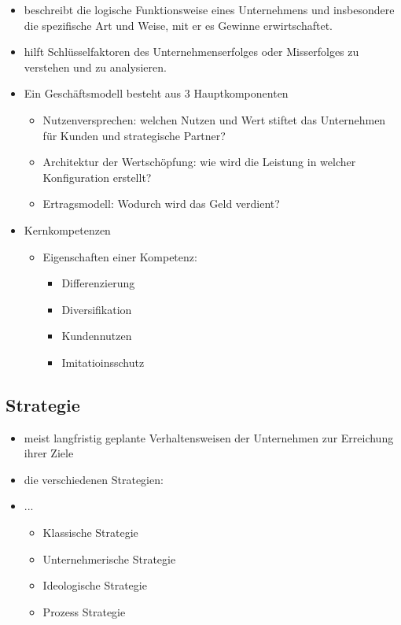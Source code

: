 \begin{itemize}
        \item beschreibt die logische Funktionsweise eines Unternehmens und insbesondere die spezifische Art und Weise, mit er es Gewinne erwirtschaftet.

        \item hilft Schlüsselfaktoren des Unternehmenserfolges oder Misserfolges zu verstehen und zu analysieren.

    \item Ein Geschäftsmodell besteht aus 3 Hauptkomponenten
    \begin{itemize}
        \item Nutzenversprechen: welchen Nutzen und Wert stiftet das Unternehmen für Kunden und strategische Partner?
        \item Architektur der Wertschöpfung: wie wird die Leistung in welcher Konfiguration erstellt?
        \item Ertragsmodell: Wodurch wird das Geld verdient?
    \end{itemize}


    \item Kernkompetenzen
    \begin{itemize}
        \item Eigenschaften einer Kompetenz:

        \begin{itemize}
            \item Differenzierung
            \item Diversifikation
            \item Kundennutzen
            \item Imitatioinsschutz
        \end{itemize}
    \end{itemize}


\end{itemize}



\subsection{Strategie}


\begin{itemize}
    \item meist langfristig geplante Verhaltensweisen der Unternehmen zur Erreichung ihrer Ziele
        \item die verschiedenen Strategien:
    \item ...
    \begin{itemize}
        \item Klassische Strategie
        \item Unternehmerische Strategie
        \item Ideologische Strategie
        \item Prozess Strategie
        \end{itemize}

\end{itemize}


